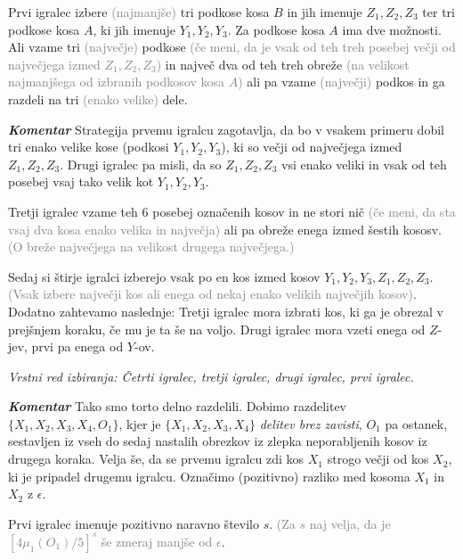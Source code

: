 \documentclass[a4paper,12pt]{article}
\begin{document}
\begin{protokol}
\item Prvi igralec izbere \textcolor{gray}{(najmanjše)} tri podkose kosa $B$ in jih imenuje $Z_1, Z_2, Z_3$ ter tri podkose kosa $A$, ki jih imenuje $Y_1, Y_2, Y_3$. Za podkose kosa $A$ ima dve možnosti. Ali vzame tri \textcolor{gray}{(največje)} podkose \textcolor{gray}{(če meni, da je vsak od teh treh posebej večji od največjega izmed $Z_1, Z_2, Z_3$)} in največ dva od teh treh obreže \textcolor{gray}{(na velikost najmanjšega od izbranih podkosov kosa $A$)} ali pa vzame \textcolor{gray}{(največji)} podkos in ga razdeli na tri \textcolor{gray}{(enako velike)} dele.

\item [\textbf{\em Komentar}] Strategija prvemu igralcu zagotavlja, da bo v vsakem primeru dobil tri enako velike kose (podkosi $Y_1, Y_2, Y_3$), ki so večji od največjega izmed $Z_1, Z_2, Z_3$. Drugi igralec pa misli, da so $Z_1, Z_2, Z_3$ vsi enako veliki in vsak od teh posebej vsaj tako velik kot $Y_1, Y_2, Y_3$.

\item Tretji igralec vzame teh 6 posebej označenih kosov in ne stori nič \textcolor{gray}{(če meni, da sta vsaj dva kosa enako velika in največja)} ali pa obreže enega izmed šestih kososv. \textcolor{gray}{(O breže največjega na velikost drugega največjega.)}

\item  Sedaj si štirje igralci izberejo vsak po en kos izmed kosov $Y_1, Y_2, Y_3, Z_1, Z_2, Z_3$. \textcolor{gray}{(Vsak izbere največji kos ali enega od nekaj enako velikih največjih kosov)}. Dodatno zahtevamo naslednje: Tretji igralec mora izbrati kos, ki ga je obrezal v prejšnjem koraku, če mu je ta še na voljo. Drugi igralec mora vzeti enega od $Z$-jev, prvi pa enega od $Y$-ov.

\textsl{Vrstni red izbiranja: Četrti igralec, tretji igralec, drugi igralec, prvi igralec.}

\item [\textbf{\em Komentar}] Tako smo torto delno razdelili. Dobimo razdelitev ${\{X_1, X_2, X_3, X_4, O_1\}}$, kjer je ${\{X_1, X_2, X_3, X_4\}}$ {\em delitev brez zavisti}, $O_1$ pa ostanek, sestavljen iz vseh do sedaj nastalih obrezkov iz zlepka neporabljenih kosov iz drugega koraka. Velja še, da se prvemu igralcu zdi kos $X_1$ strogo večji od kos $X_2$, ki je pripadel drugemu igralcu. Označimo (pozitivno) razliko med kosoma $X_1$ in $X_2$ z $\epsilon$.

\item Prvi igralec imenuje pozitivno naravno število $s$. \textcolor{gray}{(Za $s$ naj velja, da je $[4\mu_1(O_1)/5]^s$ še zmeraj manjše od $\epsilon$}. 


\end{protokol}
\end{document}
